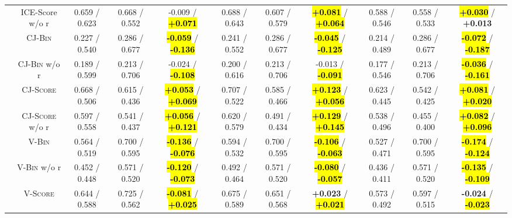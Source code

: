 \begin{table}[!t]
\begin{tabular}{@{}c|c|ccc|ccc|ccc@{}}
                    & ICE-Score w/o r          & 0.659 / 0.623    & 0.668 / 0.552    & -0.009 / \hl{\textbf{+0.071}}                & 0.688 / 0.643    & 0.607 / 0.579    & \hl{\textbf{+0.081}} / \hl{\textbf{+0.064}}  & 0.588 / 0.546    & 0.558 / 0.533    & \hl{\textbf{+0.030}} / \textbf{+0.013}       \\
        \cmidrule{2-11}
                    & \textsc{CJ-Bin}          & 0.227 / 0.540    & 0.286 / 0.677    & \hl{\textbf{-0.059}} / \hl{\textbf{-0.136}}  & 0.241 / 0.552    & 0.286 / 0.677    & \hl{\textbf{-0.045}} / \hl{\textbf{-0.125}}  & 0.214 / 0.489    & 0.286 / 0.677    & \hl{\textbf{-0.072}} / \hl{\textbf{-0.187}}  \\
                    & \textsc{CJ-Bin} w/o r    & 0.189 / 0.599    & 0.213 / 0.706    & -0.024 / \hl{\textbf{-0.108}}                & 0.200 / 0.616    & 0.213 / 0.706    & -0.013 / \hl{\textbf{-0.091}}                & 0.177 / 0.546    & 0.213 / 0.706    & \hl{\textbf{-0.036}} / \hl{\textbf{-0.161}}  \\
                    & \textsc{CJ-Score}        & 0.668 / 0.506    & 0.615 / 0.436    & \hl{\textbf{+0.053}} / \hl{\textbf{+0.069}}  & 0.707 / 0.522    & 0.585 / 0.466    & \hl{\textbf{+0.123}} / \hl{\textbf{+0.056}}  & 0.623 / 0.445    & 0.542 / 0.425    & \hl{\textbf{+0.081}} / \hl{\textbf{+0.020}}  \\
                    & \textsc{CJ-Score} w/o r  & 0.597 / 0.558    & 0.541 / 0.437    & \hl{\textbf{+0.056}} / \hl{\textbf{+0.121}}  & 0.620 / 0.579    & 0.491 / 0.434    & \hl{\textbf{+0.129}} / \hl{\textbf{+0.145}}  & 0.538 / 0.496    & 0.455 / 0.400    & \hl{\textbf{+0.082}} / \hl{\textbf{+0.096}}  \\
        \cmidrule{2-11}
                    & \textsc{V-Bin}           & 0.564 / 0.519    & 0.700 / 0.595    & \hl{\textbf{-0.136}} / \hl{\textbf{-0.076}}  & 0.594 / 0.532    & 0.700 / 0.595    & \hl{\textbf{-0.106}} / \hl{\textbf{-0.063}}  & 0.527 / 0.471    & 0.700 / 0.595    & \hl{\textbf{-0.174}} / \hl{\textbf{-0.124}}  \\
                    & \textsc{V-Bin} w/o r     & 0.452 / 0.448    & 0.571 / 0.520    & \hl{\textbf{-0.120}} / \hl{\textbf{-0.073}}  & 0.492 / 0.464    & 0.571 / 0.520    & \hl{\textbf{-0.080}} / \hl{\textbf{-0.057}}  & 0.436 / 0.411    & 0.571 / 0.520    & \hl{\textbf{-0.135}} / \hl{\textbf{-0.109}}  \\
                    & \textsc{V-Score}         & 0.644 / 0.588    & 0.725 / 0.562    & \hl{\textbf{-0.081}} / \hl{\textbf{+0.025}}  & 0.675 / 0.589    & 0.651 / 0.568    & \textbf{+0.023} / \hl{\textbf{+0.021}}       & 0.573 / 0.492    & 0.597 / 0.515    & \textbf{-0.024} / \hl{\textbf{-0.023}}       \\

\end{tabular}
\end{table}

